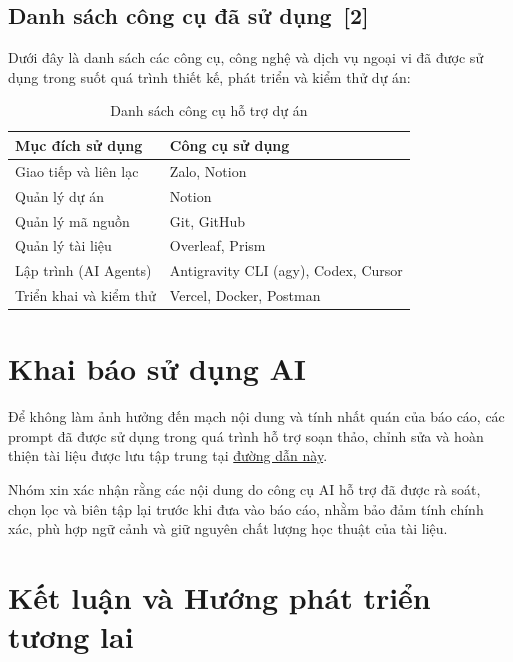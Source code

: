 \documentclass[12pt, a4paper]{article}
\begin{document}
\subsection[Danh sách công cụ đã sử dụng]{Danh sách công cụ đã sử dụng \,{\normalfont\small\textcolor{cyan!70!black}{[2]}}}

Dưới đây là danh sách các công cụ, công nghệ và dịch vụ ngoại vi đã được sử dụng trong suốt quá trình thiết kế, phát triển và kiểm thử dự án:

\renewcommand{\arraystretch}{1.5}
\begin{table}[H]
    \centering
    \begin{tabularx}{\textwidth}{|l|X|}
    \hline
    \textbf{Mục đích sử dụng} & \textbf{Công cụ sử dụng} \\
    \hline
    Giao tiếp và liên lạc & Zalo, Notion \\
    \hline
    Quản lý dự án & Notion \\
    \hline
    Quản lý mã nguồn & Git, GitHub \\
    \hline
    Quản lý tài liệu & Overleaf, Prism \\
    
    \hline
    Lập trình (AI Agents) & Antigravity CLI (agy), Codex, Cursor \\
    \hline
    Triển khai và kiểm thử & Vercel, Docker, Postman \\
    \hline
    \end{tabularx}
    \caption{Danh sách công cụ hỗ trợ dự án}
\end{table}

\section{Khai báo sử dụng AI}

Để không làm ảnh hưởng đến mạch nội dung và tính nhất quán của báo cáo, các prompt đã được sử dụng trong quá trình hỗ trợ soạn thảo, chỉnh sửa và hoàn thiện tài liệu được lưu tập trung tại \href{https://drive.google.com/drive/folders/1WBT6I9GfLjO4IJqgwYGatMThtZD1FlW0}{đường dẫn này}.

Nhóm xin xác nhận rằng các nội dung do công cụ AI hỗ trợ đã được rà soát, chọn lọc và biên tập lại trước khi đưa vào báo cáo, nhằm bảo đảm tính chính xác, phù hợp ngữ cảnh và giữ nguyên chất lượng học thuật của tài liệu.

\section{Kết luận và Hướng phát triển tương lai}
\end{document}
